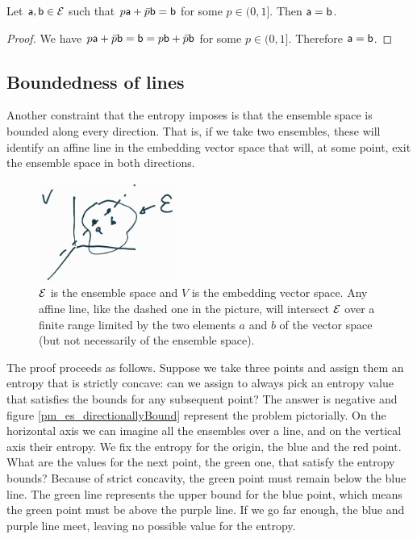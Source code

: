 \begin{mathSection}
	\begin{coro}
		Let $\ens[a], \ens[b] \in \Ens$ such that $p\ens[a] + \bar{p} \ens[b] = \ens[b]$ for some $p \in (0,1]$. Then $\ens[a] = \ens[b]$. 
	\end{coro}
	
	\begin{proof}
		We have $p\ens[a] + \bar{p} \ens[b] = \ens[b] = p\ens[b] + \bar{p} \ens[b]$ for some $p \in (0,1]$. Therefore $\ens[a] = \ens[b]$.
	\end{proof}
\end{mathSection}

\subsection{Boundedness of lines}

Another constraint that the entropy imposes is that the ensemble space is bounded along every direction. That is, if we take two ensembles, these will identify an affine line in the embedding vector space that will, at some point, exit the ensemble space in both directions.

\begin{figure}[h]
	\centering
	\includegraphics[width=0.4\textwidth]{tempimages/BoundedEnsembleSpace.jpg}
	\caption{$\Ens$ is the ensemble space and $V$ is the embedding vector space. Any affine line, like the dashed one in the picture, will intersect $\Ens$ over a finite range limited by the two elements $a$ and $b$ of the vector space (but not necessarily of the ensemble space).}
\end{figure}

The proof proceeds as follows. Suppose we take three points and assign them an entropy that is strictly concave: can we assign to always pick an entropy value that satisfies the bounds for any subsequent point? The answer is negative and figure \ref{pm_es_directionallyBound} represent the problem pictorially. On the horizontal axis we can imagine all the ensembles over a line, and on the vertical axis their entropy. We fix the entropy for the origin, the blue and the red point. What are the values for the next point, the green one, that satisfy the entropy bounds? Because of strict concavity, the green point must remain below the blue line. The green line represents the upper bound for the blue point, which means the green point must be above the purple line. If we go far enough, the blue and purple line meet, leaving no possible value for the entropy.

